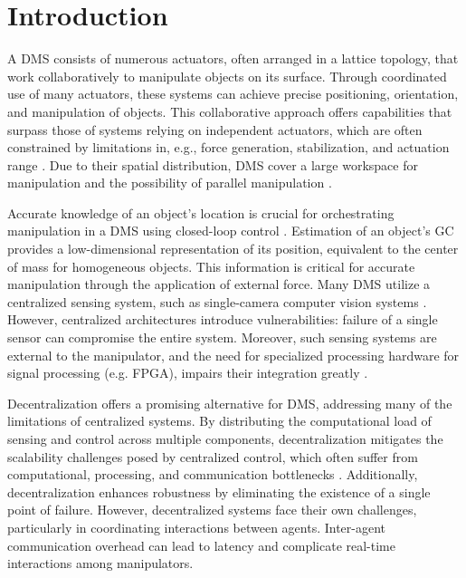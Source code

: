 \section{Introduction}
A \ac{DMS} consists of numerous actuators, often arranged in a lattice topology, that work collaboratively to manipulate objects on its surface. Through coordinated use of many actuators, these systems can achieve precise positioning, orientation, and manipulation of objects.
This collaborative approach offers capabilities that surpass those of systems relying on independent actuators, which are often constrained by limitations in, e.g., force generation, stabilization, and actuation range \cite{bohringerDistributedManipulation2000}. Due to their spatial distribution, \ac{DMS} cover a large workspace for manipulation and the possibility of parallel manipulation \cite{reznik_cmon_2001, ataka_design_2009}.


Accurate knowledge of an object's location is crucial for orchestrating manipulation in a \ac{DMS}  using closed-loop control \cite{luntz_distributed_2001}. Estimation of an object's \ac{GC} provides a low-dimensional representation of its position, equivalent to the center of mass for homogeneous objects. This information is critical for accurate manipulation through the application of external force. Many \ac{DMS} utilize a centralized sensing system, such as single-camera computer vision systems \cite{murphey_feedback_2004}. However, centralized architectures introduce vulnerabilities: failure of a single sensor can compromise the entire system. Moreover, such sensing systems are external to the manipulator, and the need for specialized processing hardware for signal processing (e.g. FPGA), impairs their integration greatly \cite{ataka_layer-built_2007}.

Decentralization offers a promising alternative for \ac{DMS}, addressing many of the limitations of centralized systems. By distributing the computational load of sensing and control across multiple components, decentralization mitigates the scalability challenges posed by centralized control, which often suffer from computational, processing, and communication bottlenecks \cite{agarwal_velocity_1998}. Additionally, decentralization enhances robustness by eliminating the existence of a single point of failure. 
However, decentralized systems face their own challenges, particularly in coordinating interactions between agents. Inter-agent communication overhead can lead to latency and complicate real-time interactions among manipulators. %

